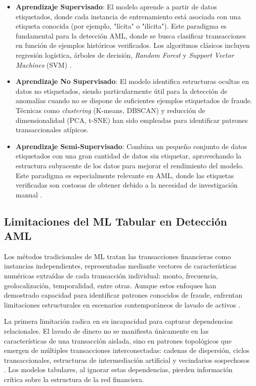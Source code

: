 \begin{itemize}
    \item \textbf{Aprendizaje Supervisado}: El modelo aprende a partir de datos etiquetados, donde cada instancia de entrenamiento está asociada con una etiqueta conocida (por ejemplo, "lícita" o "ilícita"). Este paradigma es fundamental para la detección AML, donde se busca clasificar transacciones en función de ejemplos históricos verificados. Los algoritmos clásicos incluyen regresión logística, árboles de decisión, \textit{Random Forest} y \textit{Support Vector Machines} (SVM) \cite{Unagar2025SurveyXAI}.
    \item \textbf{Aprendizaje No Supervisado}: El modelo identifica estructuras ocultas en datos no etiquetados, siendo particularmente útil para la detección de anomalías cuando no se dispone de suficientes ejemplos etiquetados de fraude. Técnicas como \textit{clustering} (K-means, DBSCAN) y reducción de dimensionalidad (PCA, t-SNE) han sido empleadas para identificar patrones transaccionales atípicos.
    \item \textbf{Aprendizaje Semi-Supervisado}: Combina un pequeño conjunto de datos etiquetados con una gran cantidad de datos sin etiquetar, aprovechando la estructura subyacente de los datos para mejorar el rendimiento del modelo. Este paradigma es especialmente relevante en AML, donde las etiquetas verificadas son costosas de obtener debido a la necesidad de investigación manual \cite{Lawal2025AnDataset}.
\end{itemize}

\subsection{Limitaciones del ML Tabular en Detección AML}

Los métodos tradicionales de ML tratan las transacciones financieras como instancias independientes, representadas mediante vectores de características numéricas extraídas de cada transacción individual: monto, frecuencia, geolocalización, temporalidad, entre otras. Aunque estos enfoques han demostrado capacidad para identificar patrones conocidos de fraude, enfrentan limitaciones estructurales en escenarios contemporáneos de lavado de activos \cite{Unagar2025SurveyXAI}.

La primera limitación radica en su incapacidad para capturar dependencias relacionales. El lavado de dinero no se manifiesta únicamente en las características de una transacción aislada, sino en patrones topológicos que emergen de múltiples transacciones interconectadas: cadenas de dispersión, ciclos transaccionales, estructuras de intermediación artificial y vecindarios sospechosos \cite{Weber2019Anti-MoneyForensics, Lawal2025AnDataset}. Los modelos tabulares, al ignorar estas dependencias, pierden información crítica sobre la estructura de la red financiera.

